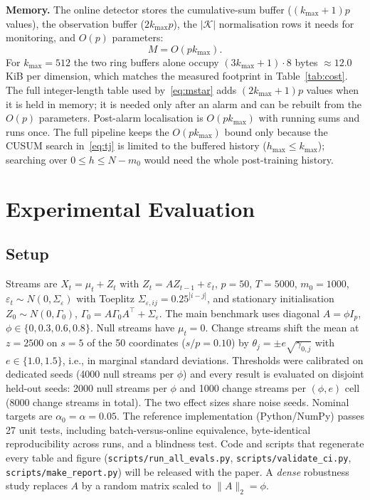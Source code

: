 \documentclass[conference]{IEEEtran}
\begin{document}
\textbf{Memory.} The online detector stores the cumulative-sum buffer ($(k_{\max}+1)p$ values), the observation buffer ($2k_{\max}p$), the $|\mathcal{K}|$ normalisation rows it needs for monitoring, and $O(p)$ parameters:
\begin{equation}
M=O(pk_{\max}). \label{eq:mem}
\end{equation}
For $k_{\max}=512$ the two ring buffers alone occupy $(3k_{\max}+1)\cdot 8$ bytes $\approx 12.0$\,KiB per dimension, which matches the measured footprint in Table~\ref{tab:cost}. The full integer-length table used by~\eqref{eq:mstar} adds $(2k_{\max}+1)p$ values when it is held in memory; it is needed only after an alarm and can be rebuilt from the $O(p)$ parameters. Post-alarm localisation is $O(pk_{\max})$ with running sums and runs once. The full pipeline keeps the $O(pk_{\max})$ bound only because the CUSUM search in~\eqref{eq:tj} is limited to the buffered history ($h_{\max}\le k_{\max}$); searching over $0\le h\le N-m_0$ would need the whole post-training history.

\section{Experimental Evaluation}\label{sec:exp}
\subsection{Setup}
Streams are $X_t=\mu_t+Z_t$ with $Z_t=AZ_{t-1}+\varepsilon_t$, $p=50$, $T=5000$, $m_0=1000$, $\varepsilon_t\sim N(0,\Sigma_\varepsilon)$ with Toeplitz $\Sigma_{\varepsilon,ij}=0.25^{|i-j|}$, and stationary initialisation $Z_0\sim N(0,\Gamma_0)$, $\Gamma_0=A\Gamma_0A^\top+\Sigma_\varepsilon$. The main benchmark uses diagonal $A=\phi I_p$, $\phi\in\{0,0.3,0.6,0.8\}$. Null streams have $\mu_t=0$. Change streams shift the mean at $z=2500$ on $s=5$ of the 50 coordinates ($s/p=0.10$) by $\theta_j=\pm e\sqrt{\gamma_{0,j}}$ with $e\in\{1.0,1.5\}$, i.e., in marginal standard deviations. Thresholds were calibrated on dedicated seeds (4000 null streams per $\phi$) and every result is evaluated on disjoint held-out seeds: 2000 null streams per $\phi$ and 1000 change streams per $(\phi,e)$ cell (8000 change streams in total). The two effect sizes share noise seeds. Nominal targets are $\alpha_0=\alpha=0.05$. The reference implementation (Python/NumPy) passes 27 unit tests, including batch-versus-online equivalence, byte-identical reproducibility across runs, and a blindness test. Code and scripts that regenerate every table and figure (\texttt{scripts/run\_all\_evals.py}, \texttt{scripts/validate\_ci.py}, \texttt{scripts/make\_report.py}) will be released with the paper. A \emph{dense} robustness study replaces $A$ by a random matrix scaled to $\|A\|_2=\phi$.
\end{document}

